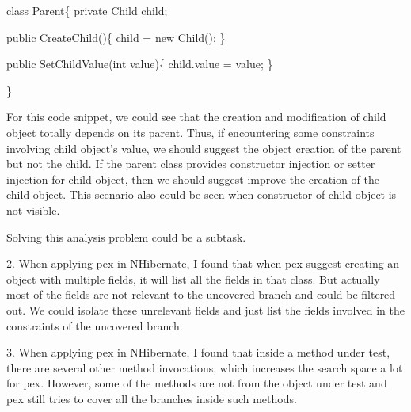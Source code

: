 \begin{scriptsize}
class Parent\{                                            
private Child child;                                      

public CreateChild()\{                              
	child = new Child();                                               
\}

public SetChildValue(int value)\{                              
	child.value = value;                                              
\}

\}

\end{scriptsize} 

For this code snippet, we could see that the creation and modification of child object totally depends on its parent. Thus, if encountering some constraints involving child object's value, we should suggest the object creation of the parent but not the child. If the parent class provides constructor injection or setter injection for child object, then we should suggest improve the creation of the child object. This scenario also could be seen when constructor of child object is not visible.

Solving this analysis problem could be a subtask.

2. When applying pex in NHibernate, I found that when pex suggest creating an object with multiple fields, it will list all the fields in that class. But actually most of the fields are not relevant to the uncovered branch and could be filtered out. We could isolate these unrelevant fields and just list the fields involved in the constraints of the uncovered branch.

3. When applying pex in NHibernate, I found that inside a method under test, there are several other method invocations, which increases the search space a lot for pex. However, some of the methods are not from the object under test and pex still tries to cover all the branches inside such methods. 

